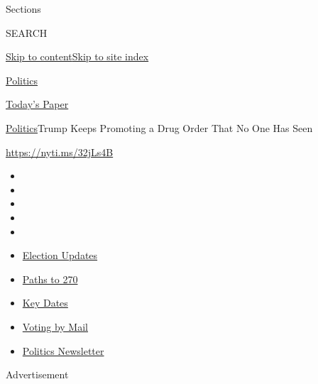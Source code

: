Sections

SEARCH

\protect\hyperlink{site-content}{Skip to
content}\protect\hyperlink{site-index}{Skip to site index}

\href{https://www.nytimes3xbfgragh.onion/section/politics}{Politics}

\href{https://myaccount.nytimes3xbfgragh.onion/auth/login?response_type=cookie\&client_id=vi}{}

\href{https://www.nytimes3xbfgragh.onion/section/todayspaper}{Today's
Paper}

\href{/section/politics}{Politics}\textbar{}Trump Keeps Promoting a Drug
Order That No One Has Seen

\url{https://nyti.ms/32jLs4B}

\begin{itemize}
\item
\item
\item
\item
\item
\end{itemize}

\begin{itemize}
\item
  \href{https://www.nytimes3xbfgragh.onion/live/2020/09/11/us/trump-vs-biden?action=click\&pgtype=Article\&state=default\&region=TOP_BANNER\&context=storylines_menu}{Election
  Updates}
\item
  \href{https://www.nytimes3xbfgragh.onion/interactive/2020/us/elections/election-states-biden-trump.html?action=click\&pgtype=Article\&state=default\&region=TOP_BANNER\&context=storylines_menu}{Paths
  to 270}
\item
  \href{https://www.nytimes3xbfgragh.onion/interactive/2019/us/elections/2020-presidential-election-calendar.html?action=click\&pgtype=Article\&state=default\&region=TOP_BANNER\&context=storylines_menu}{Key
  Dates}
\item
  \href{https://www.nytimes3xbfgragh.onion/interactive/2020/08/31/us/politics/vote-by-mail-deadlines.html?action=click\&pgtype=Article\&state=default\&region=TOP_BANNER\&context=storylines_menu}{Voting
  by Mail}
\item
  \href{https://www.nytimes3xbfgragh.onion/newsletters/politics?action=click\&pgtype=Article\&state=default\&region=TOP_BANNER\&context=storylines_menu}{Politics
  Newsletter}
\end{itemize}

Advertisement

